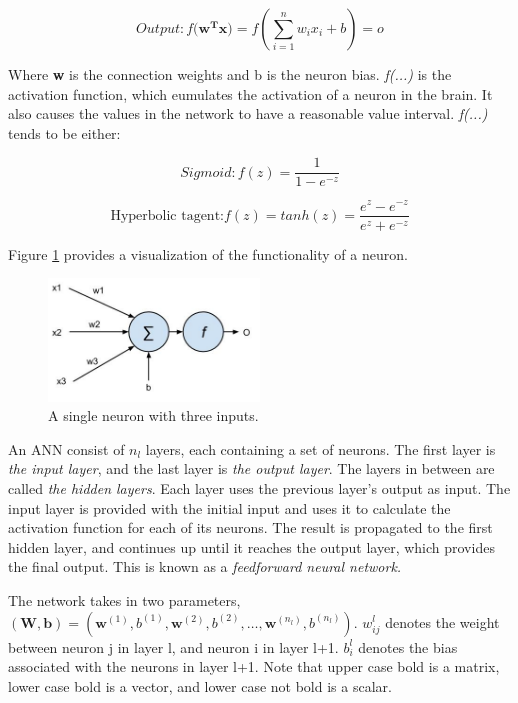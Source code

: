\begin{equation}\label{eq_neuron_out}
Output: f(\mathbf{w^{T}x)} = f(\sum_{i=1}^{n}w_i x_i + b) = o
\end{equation}

Where \textbf{w} is the connection weights and b is the neuron bias. \textit{f(...)} is the activation function, which eumulates the activation of a neuron in the brain. It also causes the values in the network to have a reasonable value interval. \textit{f(...)} tends to be either:

\begin{equation}
Sigmoid: f(z) = \frac{1}{1 - e^{-z}}
\end{equation}



\begin{equation}
\text{Hyperbolic tagent:} f(z) = tanh(z) = \frac{e^z - e^{-z}}{e^z + e^{-z}}
\end{equation}



Figure \ref{fig_neuron} provides a visualization of the functionality of a neuron. 

\begin{figure}[h!]
  \centering
      \includegraphics[width=0.5\textwidth, scale=0.1]{Figures/Background/Neuron}
  \caption{A single neuron with three inputs. }
  \label{fig_neuron}
\end{figure}

An ANN consist of $ n_l $ layers, each containing a set of neurons. The first layer is \textit{the input layer}, and the last layer is \textit{the output layer}. The layers in between are called \textit{the hidden layers}. Each layer uses the previous layer's output as input. The input layer is provided with the initial input and uses it to calculate the activation function for each of its neurons. The result is propagated to the first hidden layer, and continues up until it reaches the output layer, which provides the final output. This is known as a \textit{feedforward neural network.}

The network takes in two parameters, $ (\mathbf{W, b}) = (\mathbf{w}^{(1)}, b^{(1)}, 
\mathbf{w}^{(2)}, b^{(2)}, \dots , 
\mathbf{w}^{(n_l)}, b^{(n_l)}) $. $ w_{ij}^l $ denotes the weight between neuron j in layer l, and neuron i in layer l+1. $ b_i^l $ denotes the bias associated with the neurons in layer l+1. Note that upper case bold is a matrix, lower case bold is a vector, and lower case not bold is a scalar. 



